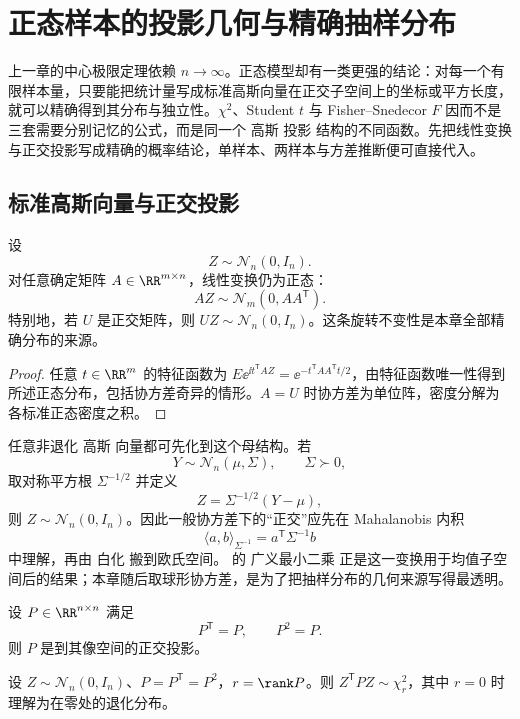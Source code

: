 \chapter{正态样本的投影几何与精确抽样分布}\label{chap:math-stat-gaussian-sampling}

上一章的中心极限定理依赖 $n\to\infty$。正态模型却有一类更强的结论：对每一个有限样本量，只要能把统计量写成标准高斯向量在正交子空间上的坐标或平方长度，就可以精确得到其分布与独立性。$\chi^2$、Student $t$ 与 Fisher--Snedecor $F$ 因而不是三套需要分别记忆的公式，而是同一个 高斯 投影 结构的不同函数。先把线性变换与正交投影写成精确的概率结论，单样本、两样本与方差推断便可直接代入。

\section{标准高斯向量与正交投影}

\begin{proposition}[高斯线性像与旋转不变性]
设
\[
 Z\sim\mathcal N_n(0,I_n).
\]
对任意确定矩阵 $A\in\RR^{m\times n}$，线性变换仍为正态：
\[
 AZ\sim\mathcal N_m(0,AA^{\mathsf T}).
\]
特别地，若 $U$ 是正交矩阵，则 $UZ\sim\mathcal N_n(0,I_n)$。这条旋转不变性是本章全部精确分布的来源。
\end{proposition}
\begin{proof}
任意 $t\in\RR^m$ 的特征函数为 $E \ee^{\ii t^{\mathsf T}AZ}=\ee^{-t^{\mathsf T}AA^{\mathsf T}t/2}$，由特征函数唯一性得到所述正态分布，包括协方差奇异的情形。$A=U$ 时协方差为单位阵，密度分解为各标准正态密度之积。
\end{proof}

任意非退化 高斯 向量都可先化到这个母结构。若
\[
 Y\sim\mathcal N_n(\mu,\Sigma),
 \qquad
 \Sigma\succ0,
\]
取对称平方根 $\Sigma^{-1/2}$ 并定义
\begin{equation*}Z=\Sigma^{-1/2}(Y-\mu),
\end{equation*}
则 $Z\sim\mathcal N_n(0,I_n)$。因此一般协方差下的“正交”应先在 Mahalanobis 内积
\[
 \langle a,b\rangle_{\Sigma^{-1}}
 =a^{\mathsf T}\Sigma^{-1}b
\]
中理解，再由 白化 搬到欧氏空间。 的 广义最小二乘 正是这一变换用于均值子空间后的结果；本章随后取球形协方差，是为了把抽样分布的几何来源写得最透明。

\begin{definition}[正交投影]
设 $P\in\RR^{n\times n}$ 满足
\[
 P^{\mathsf T}=P,
 \qquad
 P^2=P.
\]
则 $P$ 是到其像空间的正交投影。
\end{definition}
\begin{proposition}[投影平方长度的分布]
设 $Z\sim\mathcal N_n(0,I_n)$、$P=P^{\mathsf T}=P^2$，$r=\rank P$。则 $Z^{\mathsf T}PZ\sim\chi^2_r$，其中 $r=0$ 时理解为在零处的退化分布。
\end{proposition}

